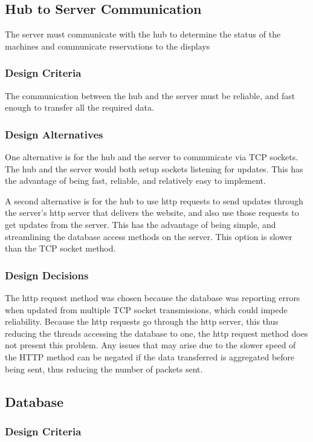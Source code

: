 \documentclass[PPFS.tex]{template/subfiles}
\begin{document}
\subsection{Hub to Server Communication}
The server must communicate with the hub to determine the status of the machines and communicate reservations to the displays

\subsubsection{Design Criteria}
The communication between the hub and the server must be reliable, and fast enough to transfer all the required data.

\subsubsection{Design Alternatives}
One alternative is for the hub and the server to communicate via TCP sockets. The hub and the server would both setup sockets listening for updates. This has the advantage of being fast, reliable, and relatively easy to implement.

A second alternative is for the hub to use http requests to send updates through the server's http server that delivers the website, and also use those requests to get updates from the server. This has the advantage of being simple, and streamlining the database access methods on the server. This option is slower than the TCP socket method.

\subsubsection{Design Decisions}
The http request method was chosen because the database was reporting errors when updated from multiple TCP socket transmissions, which could impede reliability. Because the http requests go through the http server, this thus reducing the threads accessing the database to one, the http request method does not present this problem. Any issues that may arise due to the slower speed of the HTTP method can be negated if the data transferred is aggregated before being sent, thus reducing the number of packets sent.

\subsection{Database}

\subsubsection{Design Criteria}
\end{document}
